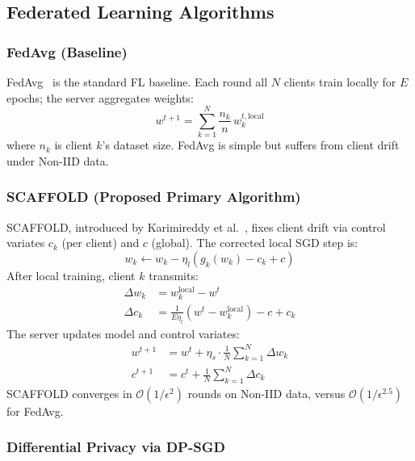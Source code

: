 \documentclass[10pt, conference]{IEEEtran}
\begin{document}
\subsection{Federated Learning Algorithms}

\subsubsection{FedAvg (Baseline)}

FedAvg~\cite{r6} is the standard FL baseline. Each round all $N$ clients train
locally for $E$ epochs; the server aggregates weights:
\begin{equation}
  w^{t+1} = \sum_{k=1}^{N} \frac{n_k}{n}\,w_k^{t,\mathrm{local}}
  \label{eq:fedavg}
\end{equation}
where $n_k$ is client $k$'s dataset size. FedAvg is simple but suffers from
client drift under Non-IID data.

\subsubsection{SCAFFOLD (Proposed Primary Algorithm)}

SCAFFOLD, introduced by Karimireddy et al.~\cite{r5}, fixes client drift via
control variates $c_k$ (per client) and $c$ (global). The corrected local SGD
step is:
\begin{equation}
  w_k \leftarrow w_k - \eta_l\!\left(g_k(w_k) - c_k + c\right)
  \label{eq:scaffold_step}
\end{equation}
After local training, client $k$ transmits:
\begin{align}
  \Delta w_k &= w_k^{\mathrm{local}} - w^t \\
  \Delta c_k &= \frac{1}{E\eta_l}\!\left(w^t - w_k^{\mathrm{local}}\right) - c + c_k
\end{align}
The server updates model and control variates:
\begin{align}
  w^{t+1} &= w^t + \eta_s\cdot\frac{1}{N}\sum_{k=1}^{N}\Delta w_k \\
  c^{t+1} &= c^t + \frac{1}{N}\sum_{k=1}^{N}\Delta c_k
\end{align}
SCAFFOLD converges in $\mathcal{O}(1/\epsilon^2)$ rounds on Non-IID data,
versus $\mathcal{O}(1/\epsilon^{2.5})$ for FedAvg.

\subsubsection{Differential Privacy via DP-SGD}
\end{document}
